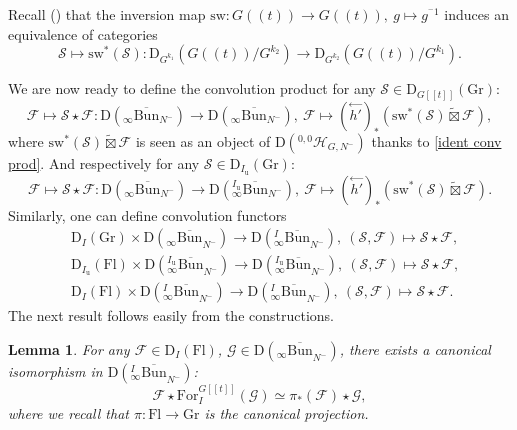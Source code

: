 \documentclass[11pt]{amsart}
\theoremstyle{plain}
\newtheorem{lem}[thm]{Lemma}
\theoremstyle{remark}
\numberwithin{equation}{section}
\begin{document}
	Recall (\cite[§5.1.1]{ABBGM}) that the inversion map $\mathrm{sw}:G((t))\to G((t)),~g\mapsto g^{^-1}$ induces an equivalence of categories
	$$\mathcal{S}\mapsto\mathrm{sw}^*(\mathcal{S}):\mathrm{D}_{G^{k_1}}(G((t))/G^{k_2})\to \mathrm{D}_{G^{k_2}}(G((t))/G^{k_1}). $$
	
	We are now ready to define the convolution product for any $\mathcal{S}\in \mathrm{D}_{G[[t]]}(\mathrm{Gr})$:
	$$\mathcal{F}\mapsto \mathcal{S}\star\mathcal{F}: \mathrm{D}(_\infty\overline{\mathrm{Bun}}_{N^-})\to \mathrm{D}(_\infty\overline{\mathrm{Bun}}_{N^-}),~\mathcal{F}\mapsto (\overset{\leftarrow}{h'})_*(\mathrm{sw}^*(\mathcal{S})\widetilde{\boxtimes}\mathcal{F}),$$
	where $\mathrm{sw}^*(\mathcal{S})\widetilde{\boxtimes}\mathcal{F}$ is seen as an object of $\mathrm{D}(^{0,0}\mathcal{H}_{G,N^{-}})$ thanks to \eqref{ident conv prod}. And respectively for any $\mathcal{S}\in \mathrm{D}_{I_\mathrm{u}}(\mathrm{Gr})$:
	$$\mathcal{F}\mapsto \mathcal{S}\star\mathcal{F}:\mathrm{D}({_\infty\overline{\mathrm{Bun}}_{N^-}})\to \mathrm{D}(^{I_\mathrm{u}}_\infty\overline{\mathrm{Bun}}_{N^-}),~\mathcal{F}\mapsto (\overset{\leftarrow}{h'})_*(\mathrm{sw}^*(\mathcal{S})\widetilde{\boxtimes}\mathcal{F}).$$
	Similarly, one can define convolution functors
	\begin{align*}
 &\mathrm{D}_I(\mathrm{Gr})\times\mathrm{D}({_\infty\overline{\mathrm{Bun}}}_{N^-})\to  \mathrm{D}({^{I}_\infty\overline{\mathrm{Bun}}}_{N^-}),~(\mathcal{S},\mathcal{F})\mapsto\mathcal{S}\star\mathcal{F},\\
	    &\mathrm{D}_{I_\mathrm{u}}(\mathrm{Fl})\times\mathrm{D}({^{I_\mathrm{u}}_\infty\overline{\mathrm{Bun}}}_{N^-})\to  \mathrm{D}({^{I_\mathrm{u}}_\infty\overline{\mathrm{Bun}}}_{N^-}),~(\mathcal{S},\mathcal{F})\mapsto\mathcal{S}\star\mathcal{F},\\
     &\mathrm{D}_{I}(\mathrm{Fl})\times\mathrm{D}({^{I}_\infty\overline{\mathrm{Bun}}}_{N^-})\to  \mathrm{D}({^{I}_\infty\overline{\mathrm{Bun}}}_{N^-}),~(\mathcal{S},\mathcal{F})\mapsto\mathcal{S}\star\mathcal{F}.
	\end{align*}
The next result follows easily from the constructions.
\begin{lem}\label{lem conv for}
    For any $\mathcal{F}\in\mathrm{D}_{I}(\mathrm{Fl})$, $\mathcal{G}\in\mathrm{D}({_\infty\overline{\mathrm{Bun}}}_{N^-})$, there exists a canonical isomorphism in $\mathrm{D}({^{I}_\infty\overline{\mathrm{Bun}}}_{N^-})$:
    $$\mathcal{F}\star\mathrm{For}_I^{G[[t]]}(\mathcal{G})\simeq \pi_*(\mathcal{F})\star\mathcal{G}, $$
    where we recall that $\pi:\mathrm{Fl}\to\mathrm{Gr}$ is the canonical projection.
\end{lem}
\end{document}
